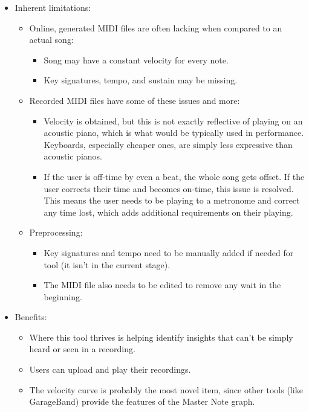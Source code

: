 \documentclass[journal]{vgtc}                %
\begin{document}
\begin{itemize}
  \item Inherent limitations:
  \begin{itemize}
    \item Online, generated MIDI files are often lacking when compared to an actual song:
    \begin{itemize}
      \item Song may have a constant velocity for every note.
      \item Key signatures, tempo, and sustain may be missing.
    \end{itemize}
    \item Recorded MIDI files have some of these issues and more:
    \begin{itemize}
      \item Velocity is obtained, but this is not exactly reflective of playing on an acoustic piano, which is what would be typically used in performance. Keyboards, especially cheaper ones, are simply less expressive than acoustic pianos.
      \item If the user is off-time by even a beat, the whole song gets offset. If the user corrects their time and becomes on-time, this issue is resolved. This means the user needs to be playing to a metronome and correct any time lost, which adds additional requirements on their playing.
    \end{itemize}
    \item Preprocessing:
    \begin{itemize}
      \item Key signatures and tempo need to be manually added if needed for tool (it isn’t in the current stage).
      \item The MIDI file also needs to be edited to remove any wait in the beginning.
    \end{itemize}
  \end{itemize}
  \item Benefits:
  \begin{itemize}
    \item Where this tool thrives is helping identify insights that can’t be simply heard or seen in a recording.
    \item Users can upload and play their recordings.
    \item The velocity curve is probably the most novel item, since other tools (like GarageBand) provide the features of the Master Note graph.
    \begin{itemize}

\end{itemize}
\end{itemize}
\end{itemize}
\end{document}
